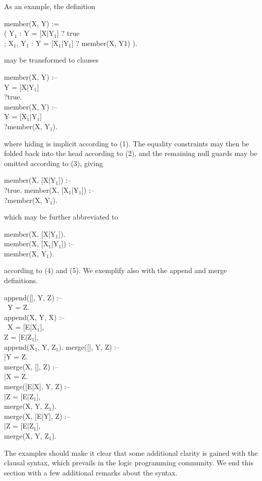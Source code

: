 As an example, the definition
%
\begin{program}
member(X, Y) := \\
\>\>( Y$_1$ : Y = [X|Y$_1$] ? true \\
\>\>; X$_1$, Y$_1$ : Y = [X$_1$|Y$_1$] ? member(X, Y1) ).
\end{program}%
%
may be transformed to clauses
%
\begin{program}
member(X, Y) :-- \\
\> \>Y = [X|Y$_1$] \\
\>?\>true.  \\
member(X, Y) :-- \\
\> \>Y = [X$_1$|Y$_1$] \\
\>?\>member(X, Y$_1$).
\end{program}%
%
where hiding is implicit according to (1).  The equality constraints
may then be folded back into the head according to (2), and the
remaining null guards may be omitted according to (3), giving
%
\begin{program}
member(X, [X|Y$_1$]) :-- \\
\>?\>true.  \nl
member(X, [X$_1$|Y$_1$]) :-- \\
\>?\>member(X, Y$_1$).
\end{program}%
%
which may be further abbreviated to
%
\begin{program}
member(X, [X|Y$_1$]).  \\
member(X, [X$_1$|Y$_1$]) :-- \\
\>\>member(X, Y$_1$).
\end{program}%
%
according to (4) and (5).  We exemplify also with the append and merge
definitions.
%
\begin{program}
append([], Y, Z) :-- \\
\>\cond\ \>Y = Z.  \\
append(X, Y, X) :-- \\
\>\cond\ \>X = [E|X$_1$], \\
\>	\>Z = [E|Z$_1$], \\
\>	\>append(X$_1$, Y, Z$_1$).\nl
merge([], Y, Z) :-- \\
\>|\>Y = Z.  \\
merge(X, [], Z) :-- \\
\>|\>X = Z.  \\
merge([E|X], Y, Z) :-- \\
\>|\>Z = [E|Z$_1$], \\
\> \>merge(X, Y, Z$_1$).  \\
merge(X, [E|Y], Z) :-- \\
\>|\>Z = [E|Z$_1$], \\
\> \>merge(X, Y, Z$_1$).
\end{program}%
%
The examples should make it clear that some additional clarity is
gained with the clausal syntax, which prevails in the logic
programming community.  We end this section with a few additional
remarks about the syntax.

